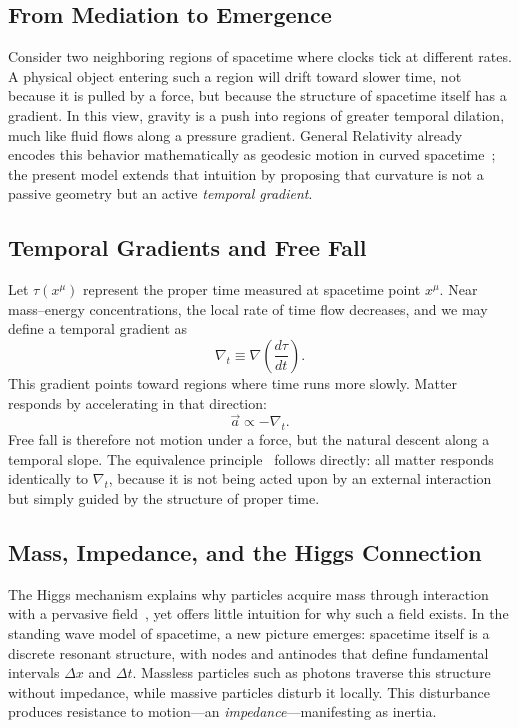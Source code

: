 \documentclass[12pt]{article}
\begin{document}
\subsection{From Mediation to Emergence}

Consider two neighboring regions of spacetime where clocks tick at different rates. A physical object entering such a region will drift toward slower time, not because it is pulled by a force, but because the structure of spacetime itself has a gradient. In this view, gravity is a push into regions of greater temporal dilation, much like fluid flows along a pressure gradient. General Relativity already encodes this behavior mathematically as geodesic motion in curved spacetime~\cite{Einstein1916,MTW1973}; the present model extends that intuition by proposing that curvature is not a passive geometry but an active \emph{temporal gradient}.

\subsection{Temporal Gradients and Free Fall}

Let $\tau(x^\mu)$ represent the proper time measured at spacetime point $x^\mu$. Near mass–energy concentrations, the local rate of time flow decreases, and we may define a temporal gradient as
\[
\nabla_t \equiv \nabla \left( \frac{d\tau}{dt} \right).
\]
This gradient points toward regions where time runs more slowly. Matter responds by accelerating in that direction:
\[
\vec{a} \propto -\nabla_t.
\]
Free fall is therefore not motion under a force, but the natural descent along a temporal slope. The equivalence principle~\cite{Einstein1907,Will2014} follows directly: all matter responds identically to $\nabla_t$, because it is not being acted upon by an external interaction but simply guided by the structure of proper time.

\subsection{Mass, Impedance, and the Higgs Connection}
\label{sec:higgs-impedance}

The Higgs mechanism explains why particles acquire mass through interaction with a pervasive field~\cite{Higgs1964,Englert1964}, yet offers little intuition for why such a field exists. In the standing wave model of spacetime, a new picture emerges: spacetime itself is a discrete resonant structure, with nodes and antinodes that define fundamental intervals $\Delta x$ and $\Delta t$. Massless particles such as photons traverse this structure without impedance, while massive particles disturb it locally. This disturbance produces resistance to motion---an \emph{impedance}---manifesting as inertia.
\end{document}
